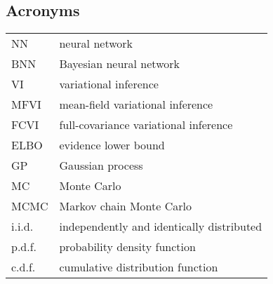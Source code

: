 \documentclass[main.tex]{subfiles}
\begin{document}
\subsection*{Acronyms}
\begin{tabular}{C{2cm}l}
    NN & neural network\\
    BNN & Bayesian neural network\\
    VI & variational inference\\
    MFVI & mean-field variational inference\\
    FCVI & full-covariance variational inference\\
    ELBO & evidence lower bound\\
    GP & Gaussian process\\
    MC & Monte Carlo\\
    MCMC & Markov chain Monte Carlo\\
    i.i.d.& independently and identically distributed\\
    p.d.f. & probability density function\\
    c.d.f. & cumulative distribution function
\end{tabular}
\end{document}
